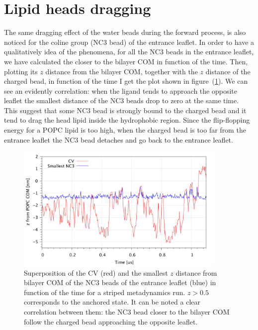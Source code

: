 \section{Lipid heads dragging}
The same dragging effect of the water beads during the forward process, is also noticed for the coline group (NC$3$ bead) of the entrance leaflet. In order to have a qualitatively idea of the phenomena, for all the NC$3$ beads in the entrance leaflet, we have calculated the closer to the bilayer \ac{COM} in function of the time. Then, plotting its $z$ distance from the bilayer \ac{COM}, together with the $z$ distance of the charged bead, in function of the time I get the plot shown in figure~(\ref{fig:NC3Correlation}). We can see an evidently correlation: when the ligand tends to approach the opposite leaflet the smallest distance of the NC$3$ beads drop to zero at the same time. This suggest that some NC$3$ bead is strongly bound to the charged bead and it tend to drag the head lipid inside the hydrophobic region. Since the flip-flopping energy for a \ac{POPC} lipid is too high, when the charged bead is too far from the entrance leaflet the NC$3$ bead detaches and go back to the entrance leaflet. 
\begin{figure}[ht]
	\center
	\includegraphics[width=0.9\textwidth]{./img/results/NC3Correlation}
	\caption{Superposition of the \acs{CV} (red) and the smallest $z$ distance from bilayer \acs{COM} of the NC$3$ beads of the entrance leaflet (blue) in function of the time for a striped metadynamics run. $z>0.5$ corresponds to the anchored state. It can be noted a clear correlation between them: the NC$3$ bead closer to the bilayer \acs{COM} follow the charged bead approaching the opposite leaflet.}
	\label{fig:NC3Correlation}
\end{figure}


